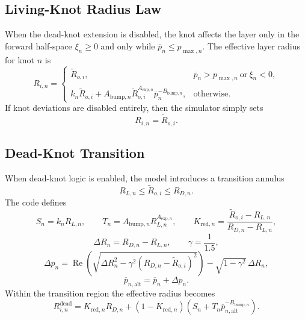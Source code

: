 \documentclass[11pt]{article}
\begin{document}
\subsection{Living-Knot Radius Law}

When the dead-knot extension is disabled, the knot affects the layer only in the forward half-space
$\xi_n \ge 0$ and only while $\overline{p}_n \le p_{\max,n}$. The effective layer radius for knot $n$ is
\begin{equation}
R_{i,n}
=
\begin{cases}
\widetilde{R}_{o,i}, &
\overline{p}_n > p_{\max,n} \ \text{or}\ \xi_n < 0, \\[4pt]
k_n \widetilde{R}_{o,i}
+
A_{\mathrm{bump},n}\widetilde{R}_{o,i}^{A_{\mathrm{exp},n}}
\overline{p}_n^{-B_{\mathrm{bump},n}}, &
\text{otherwise}.
\end{cases}
\end{equation}
If knot deviations are disabled entirely, then the simulator simply sets
\begin{equation}
R_{i,n} = \widetilde{R}_{o,i}.
\end{equation}

\subsection{Dead-Knot Transition}

When dead-knot logic is enabled, the model introduces a transition annulus
\begin{equation}
R_{L,n} \le \widetilde{R}_{o,i} \le R_{D,n}.
\end{equation}
The code defines
\begin{equation}
S_n = k_n R_{L,n},
\qquad
T_n = A_{\mathrm{bump},n} R_{L,n}^{A_{\mathrm{exp},n}},
\qquad
K_{\mathrm{red},n} = \frac{\widetilde{R}_{o,i} - R_{L,n}}{R_{D,n} - R_{L,n}},
\end{equation}
\begin{equation}
\Delta R_n = R_{D,n} - R_{L,n},
\qquad
\gamma = \frac{1}{1.5},
\end{equation}
\begin{equation}
\Delta p_n
=
\operatorname{Re}\!\left(
\sqrt{\Delta R_n^2 - \gamma^2\left(R_{D,n} - \widetilde{R}_{o,i}\right)^2}
\right)
-
\sqrt{1-\gamma^2}\,\Delta R_n,
\end{equation}
\begin{equation}
\overline{p}_{n,\mathrm{alt}} = \overline{p}_n + \Delta p_n.
\end{equation}
Within the transition region the effective radius becomes
\begin{equation}
R_{i,n}^{\mathrm{dead}}
=
K_{\mathrm{red},n} R_{D,n}
+
\left(1-K_{\mathrm{red},n}\right)
\left(
S_n + T_n \overline{p}_{n,\mathrm{alt}}^{-B_{\mathrm{bump},n}}
\right).
\end{equation}
\end{document}
